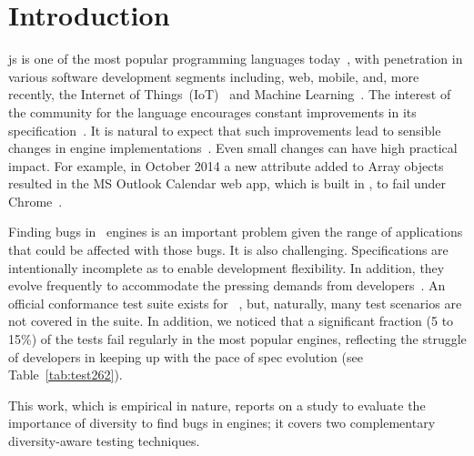 
\chapter{Introduction}
\label{sec:intro}

\gls{js} is one of the most popular programming languages
today~\cite{stackify,redmonk-javascript}, with penetration in various software development segments including, web, mobile,
and, more recently, the Internet of
Things~(IoT)~\cite{simply-technologies} and Machine Learning~\cite{github-ml}. The interest of the community
for the language encourages constant improvements in its specification~\cite{ecmas262-spec}. It is natural to expect that such improvements
lead to sensible changes in engine implementations~\cite{kangax}. Even small
changes can have high practical impact. For example, in October 2014 a
new attribute added to Array objects resulted in the MS Outlook
Calendar web app, which is built in \js{}, to fail under 
Chrome~\cite{array-bug-chromium-issue4247,array-bug-discussion}.

Finding bugs in \js\ engines is an important problem given the range
of applications that could be affected with those bugs. It is also
challenging.  Specifications are intentionally incomplete as to enable
development flexibility. In addition, they evolve frequently to
accommodate the pressing demands from
developers~\cite{ecmas262-spec-repo}. An official conformance test
suite exists for \js~\cite{tc39-github}, but, naturally, many test
scenarios are not covered in the suite. In addition, we noticed that a
significant fraction (5 to 15\%) of the tests fail regularly in the
most popular engines, reflecting the struggle of developers in keeping
up with the pace of spec evolution (see Table~\ref{tab:test262}).

This work, which is empirical in nature, reports on a study to evaluate the importance of diversity
to find bugs in \js{} engines; it covers two complementary
diversity-aware testing techniques.

